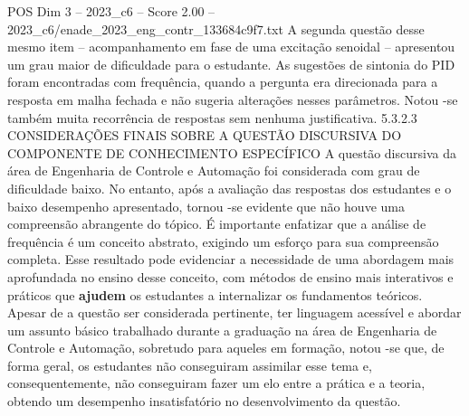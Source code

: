 \begin{textsample}{POS Dim 3 – 2023\_c6 – Score 2.00 – 2023\_c6/enade\_2023\_eng\_contr\_133684c9f7.txt}
A segunda questão desse mesmo item – acompanhamento em fase de uma excitação senoidal – apresentou um grau maior de dificuldade para o estudante.
As sugestões de sintonia do PID foram encontradas com frequência, quando a pergunta era direcionada para a resposta em malha fechada e não sugeria alterações nesses parâmetros.
Notou -se também muita recorrência de respostas sem nenhuma justificativa. 5.3.2.3 CONSIDERAÇÕES FINAIS SOBRE A QUESTÃO DISCURSIVA DO COMPONENTE DE CONHECIMENTO ESPECÍFICO A questão discursiva da área de Engenharia de Controle e Automação foi considerada com grau de dificuldade baixo.
No entanto, após a avaliação das respostas dos estudantes e o baixo desempenho apresentado, tornou -se evidente que não houve uma compreensão abrangente do tópico.
É importante enfatizar que a análise de frequência é um conceito abstrato, exigindo um esforço para sua compreensão completa.
Esse resultado pode evidenciar a necessidade de uma abordagem mais aprofundada no ensino desse conceito, com métodos de ensino mais interativos e práticos que \textbf{ajudem} os estudantes a internalizar os fundamentos teóricos.
Apesar de a questão ser considerada pertinente, ter linguagem acessível e abordar um assunto básico trabalhado durante a graduação na área de Engenharia de Controle e Automação, sobretudo para aqueles em formação, notou -se que, de forma geral, os estudantes não conseguiram assimilar esse tema e, consequentemente, não conseguiram fazer um elo entre a prática e a teoria, obtendo um desempenho insatisfatório no desenvolvimento da questão.

\end{textsample}
